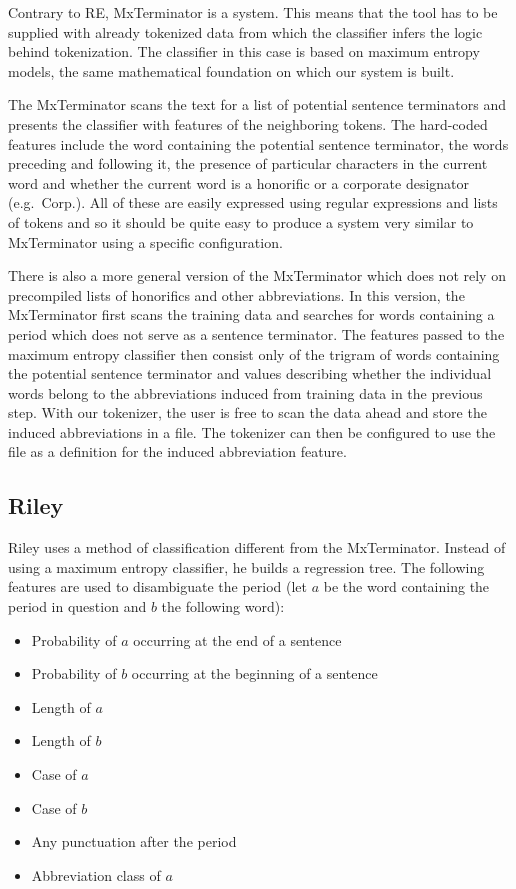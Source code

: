 Contrary to RE, MxTerminator \cite{sbd-mxterm} is a  system. This means that the tool has to be supplied with
already tokenized data from which the classifier infers the logic behind
tokenization. The classifier in this case is based on maximum entropy models,
the same mathematical foundation on which our system is built.

The MxTerminator scans the text for a list of potential sentence terminators
and presents the classifier with features of the neighboring tokens. The
hard-coded features include the word containing the potential sentence
terminator, the words preceding and following it, the presence of particular
characters in the current word and whether the current word is a honorific or a
corporate designator (e.g.\ Corp.). All of these are easily expressed using
regular expressions and lists of tokens and so it should be quite easy to
produce a system very similar to MxTerminator using a specific configuration.

There is also a more general version of the MxTerminator which does not rely on
precompiled lists of honorifics and other abbreviations. In this version, the
MxTerminator first scans the training data and searches for words containing a
period which does not serve as a sentence terminator. The features passed to
the maximum entropy classifier then consist only of the trigram of words
containing the potential sentence terminator and values describing whether the
individual words belong to the abbreviations induced from training data in the
previous step. With our tokenizer, the user is free to scan the data ahead and
store the induced abbreviations in a file. The tokenizer can then be configured
to use the file as a definition for the induced abbreviation feature.

\subsection{Riley}
\label{sec:survey-riley}

Riley \cite{sbd-riley} uses a method of classification different from the
MxTerminator. Instead of using a maximum entropy classifier, he builds a
regression tree. The following features are used to disambiguate the period
(let $a$ be the word containing the period in question and $b$ the following
word):

\begin{itemize}
  \item Probability of $a$ occurring at the end of a sentence
  \item Probability of $b$ occurring at the beginning of a sentence
  \item Length of $a$
  \item Length of $b$
  \item Case of $a$
  \item Case of $b$
  \item Any punctuation after the period
  \item Abbreviation class of $a$
\end{itemize}

